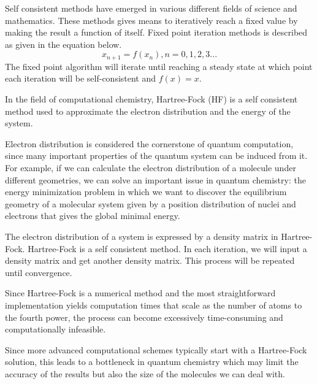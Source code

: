 \documentclass[twoside,11pt]{article}
\begin{document}
Self consistent methods have emerged in various different fields of science and mathematics. These methods gives means to iteratively reach a fixed value by making the result a function of itself. Fixed point iteration methods is described as given in the equation below.
\[
x_{n+1} = f(x_n),  n = 0,1,2,3...
\] 
The fixed point algorithm will iterate until reaching a steady state at which point each iteration will be self-consistent and $f(x)=x$.  

In the field of computational chemistry, Hartree-Fock (HF) is a self consistent method used to approximate the electron distribution and the energy of the system. 

Electron distribution is considered the cornerstone of quantum computation, since many important properties of the quantum system can be induced from it. For example, if we can calculate the electron distribution of a molecule under different geometries, we can solve an important issue in quantum chemistry: the energy minimization problem in which we want to discover the equilibrium geometry of a molecular system given by a position distribution of nuclei and electrons that gives the global minimal energy. 

 
The electron distribution of a system is expressed by a density matrix in Hartree-Fock. Hartree-Fock is a self consistent method. In each iteration, we will input a density matrix and get another density matrix. This process will be repeated until convergence.

Since Hartree-Fock is a numerical method and the most straightforward implementation yields computation times that scale as the number of atoms to the fourth power, the process can become excessively time-consuming and computationally infeasible.

Since more advanced computational schemes typically start with a Hartree-Fock solution, this leads to a bottleneck in quantum chemistry which may limit the accuracy of the results but also the size of the molecules we can deal with.

\end{document}
